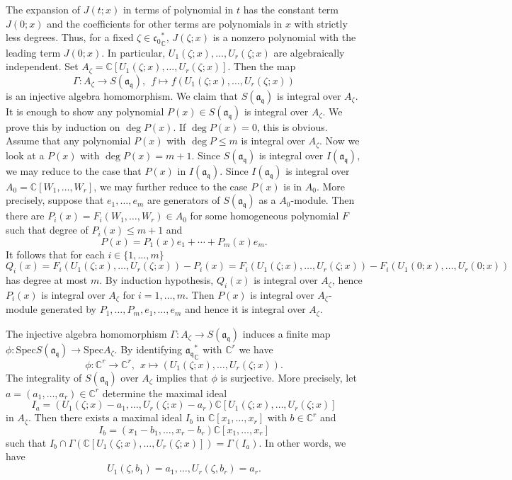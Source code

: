 \documentclass[a4paper]{amsart}
\theoremstyle{plain}
\theoremstyle{definition}
\def\deg{\operatorname{deg}}
\def\deg{\operatorname{deg}}
\newcommand{\Spec}{{\mathrm{Spec}}}
\newcommand{\fra}{\mathfrak{a}}
\newcommand{\frc}{\mathfrak{c}}
\newcommand{\frq}{\mathfrak{q}}
\newcommand{\bbC}{\mathbb{C}}
\begin{document}
The expansion of $J(t;x)$
in terms of polynomial in $t$ has the constant term $J(0;x)$
and the  coefficients for other terms are polynomials in $x$ with strictly less degrees.
Thus, for a fixed $\zeta\in{\frc_0}^*_\bbC$,  $J(\zeta;x)$ is a nonzero polynomial with the leading term $J(0;x)$.
In particular,  $U_1(\zeta;x),\ldots,U_r(\zeta;x)$ are algebraically independent. Set $A_\zeta=\bbC[U_1(\zeta;x),\ldots,U_r(\zeta;x)]$.
Then the map
$$\Gamma\colon A_\zeta\rightarrow S(\fra_\frq),  \ \
f\mapsto f(U_1(\zeta;x),\ldots,U_r(\zeta;x))$$ is an injective algebra homomorphism.
We claim that $S(\fra_\frq)$ is integral over $A_\zeta$. It is enough to show any
polynomial $P(x)\in S(\fra_\frq)$ is integral over $A_\zeta$.  We prove this by induction on
$\deg P(x)$.  If $\deg P(x)=0$, this is obvious.  Assume that any polynomial $P(x)$ with  $\deg P\leq m$ is integral over $A_\zeta$.  Now we look at a $P(x)$ with $\deg P(x)=m+1$.
Since $S(\fra_\frq)$ is integral over $I(\fra_\frq)$, we may reduce to the case that
$P(x)$ in $I(\fra_\frq)$.  Since $I(\fra_\frq)$ is integral over $A_0=\bbC[W_1,\ldots, W_r]$,
we may further reduce to the case $P(x)$ is in $A_0$.  More precisely, suppose that
$e_1,\ldots,e_m$ are generators of $S(\fra_\frq)$ as a $A_0$-module. Then there are
$P_i(x)=F_i(W_1,\ldots,W_r)\in A_0$ for some homogeneous
polynomial $F$ such that degree of $P_i(x)\leq m+1$ and
$$P(x)=P_1(x)e_1+\cdots +P_m(x)e_m.$$
It follows that for each $i\in\{1,\ldots,m\}$ $$Q_i(x)=F_i(U_1(\zeta;x),\ldots,U_r(\zeta;x))-P_i(x)=F_i(U_1(\zeta;x),\ldots,U_r(\zeta;x))-F_i(U_1(0;x),\ldots,U_r(0;x))$$
has degree at most $m$.  By induction hypothesis, $Q_i(x)$ is integral over $A_\zeta$,
hence $P_i(x)$ is integral over $A_\zeta$ for $i=1,\ldots, m$.  Then $P(x)$ is integral over $A_\zeta$-module generated by
$P_1,\ldots, P_m,e_1,\ldots , e_m$
and hence it is integral over $A_\zeta$.

The injective algebra homomorphism $\Gamma: A_\zeta \rightarrow S(\fra_\frq)$ induces a finite map
$\phi: \Spec S(\fra_\frq) \rightarrow \Spec A_\zeta$.   By identifying ${\fra_\frq}^*_\bbC$
with $\bbC^r$ we have
$$\phi\colon \bbC^r\rightarrow \bbC^r,  \ \ x\mapsto (U_1(\zeta;x),\ldots,U_r(\zeta;x)).$$
The integrality of $S(\fra_\frq)$ over $A_\zeta$ implies that $\phi$ is surjective.
More precisely, let $a=(a_1,\ldots,a_r)\in \bbC^r$ determine the maximal ideal
$$I_a=(U_1(\zeta;x)-a_1,\ldots ,U_r(\zeta;x)-a_r)\bbC[U_1(\zeta;x),\ldots,U_r(\zeta;x)]$$
in $A_\zeta$.  Then there exists a maximal ideal $I_b$ in $\bbC[x_1,\ldots,x_r]$  with $b\in \bbC^r$ and
$$I_b=(x_1-b_1,\ldots ,x_r-b_r)\bbC[x_1,\ldots,x_r]$$
such that $I_b\cap \Gamma(\bbC[U_1(\zeta;x),\ldots, U_r(\zeta;x)])=\Gamma(I_a)$.
In other words, we have
$$U_1(\zeta,b_1)=a_1,\ldots,U_r(\zeta,b_r)=a_r.$$
\end{document}

